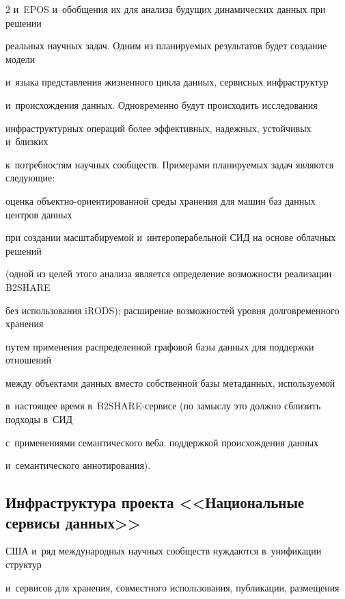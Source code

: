 \begin{multicols}{2}
и~EPOS и~обобщения их для анализа будущих динамических данных при решении 


реальных научных задач. Одним из планируемых результатов будет создание модели 


и~языка представления жизненного цикла данных, сервисных инфраструктур 


и~происхождения данных. Одновременно будут происходить исследования 


инфраструктурных операций более эффективных, надежных, устойчивых и~близких 


к~потребностям научных сообществ. Примерами планируемых задач являются следующие: 


оценка объектно-ориентированной среды хранения для машин баз данных центров данных 


при создании масштабируемой и~интероперабельной СИД на основе облачных решений 


(одной из целей этого анализа является определение возможности реализации B2SHARE 


без использования iRODS); расширение возможностей уровня долговременного хранения 


путем применения распределенной графовой базы данных для поддержки отношений 


между объектами данных вместо собственной базы метаданных, используемой 


в~настоящее время в~B2SHARE-сер\-ви\-се (по замыслу это должно сблизить подходы в~СИД 


с~применениями семантического веба, поддержкой происхождения данных 


и~семантического аннотирования).


{





}





\subsection{Инфраструктура проекта <<Национальные сервисы  данных>>}





  США и~ряд международных научных сообществ нуждаются в~унификации структур 


и~сервисов для хранения, совместного использования, публикации, размещения 



\end{multicols}
